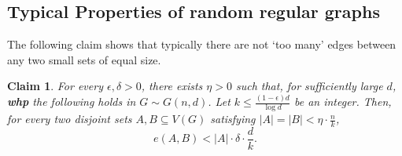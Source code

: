 \documentclass[notitlepage]{scrartcl}
\newtheorem{claim}[thm]{Claim}
\begin{document}
\subsection{Typical Properties of random regular graphs}\label{subsection:typical-properties}
The following claim shows that typically there are not `too many' edges between any two small sets of equal size. 
\begin{claim}\label{claim:global-event-between-small-sets}
    For every $\epsilon, \delta > 0$, there exists $\eta > 0$ such that, for sufficiently large $d$, \textbf{whp} the following holds in $G\sim G(n, d)$. Let $k \le \frac{(1-\epsilon)d}{\log d}$ be an integer. Then, for every two disjoint sets $A,B\subseteq V(G)$ satisfying $|A| = |B| < \eta \cdot \frac{n}{k}$,
    \[
        e(A, B) < |A| \cdot \delta \cdot \frac{d}{k}.
    \]    
\end{claim}
\end{document}
